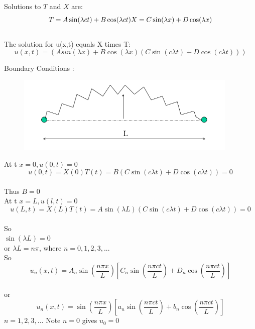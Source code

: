 \documentclass[12pt,a4paper]{article}
\begin{document}
	Solutions to $T$ and $X$ are:
	\begin{equation}\label{}
	{T = A \sin (\lambda c t) + B \cos (\lambda c t)}\\
	{X = C \sin (\lambda x) + D \cos (\lambda x)}
	\end{equation}\\
	
	The solution for u(x,t) equals X times T:
	\begin{equation}\label{}u(x,t) = (A sin (\lambda x)+ B \cos (\lambda x)(C \sin (c\lambda t)+ D \cos (c\lambda t)))
	\end{equation}
	
	Boundary Conditions :
	\begin{figure}[h]
		\begin{center}
			\includegraphics[width=400px]{wave5.PNG}
		\end{center}
	\end{figure}
	
	At t $x=0,  u(0,t)=0$\\
	$$u(0,t)=X(0)T(t)=B(C \sin (c\lambda t)+D \cos (c\lambda t)) = 0$$\\
	Thus $B = 0$\\
	At t $x=L,  u(l,t)=0$\\
	$$u(L,t)=X(L)T(t)=A \sin(\lambda L)(C \sin (c\lambda t)+D \cos (c\lambda t)) = 0$$\\
	So \\
	$\sin (\lambda L)=0$\\
	or $\lambda L = n \pi$, where $n = 0,1,2,3,. . .$\\
	So\\
	$$u_n(x,t) = A_n \sin \left(\frac{n\pi x}{L}\right)\left[C_n \sin\left(\frac{n\pi c t}{L}\right)+D_n \cos \left(\frac{n\pi c t}{L}\right)\right]$$\\
	or\\
	\begin{equation}\label{}
	u_n(x,t) = \sin\left(\frac{n\pi x}{L}\right)\left[a_n \sin\left(\frac{n\pi c t}{L}\right)+b_n\cos \left(\frac {n\pi c t}{L}\right)\right]
	\end{equation}
	$n = 1,2,3,. . .$ Note $n=0$ gives $u_0 = 0$
	
\end{document}
